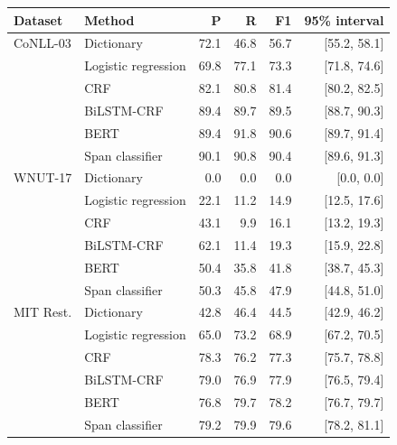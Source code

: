 \begingroup\small\setlength{\tabcolsep}{3pt}
\begin{tabular*}{\linewidth}{@{\extracolsep{\fill}}llrrrr@{}}
\toprule
Dataset & Method & P & R & F1 & 95\% interval \\
\midrule
CoNLL-03 & Dictionary & 72.1 & 46.8 & 56.7 & [55.2, 58.1] \\
 & Logistic regression & 69.8 & 77.1 & 73.3 & [71.8, 74.6] \\
 & CRF & 82.1 & 80.8 & 81.4 & [80.2, 82.5] \\
 & BiLSTM-CRF & 89.4 & 89.7 & 89.5 & [88.7, 90.3] \\
 & BERT & 89.4 & 91.8 & 90.6 & [89.7, 91.4] \\
 & Span classifier & 90.1 & 90.8 & 90.4 & [89.6, 91.3] \\
WNUT-17 & Dictionary & 0.0 & 0.0 & 0.0 & [0.0, 0.0] \\
 & Logistic regression & 22.1 & 11.2 & 14.9 & [12.5, 17.6] \\
 & CRF & 43.1 & 9.9 & 16.1 & [13.2, 19.3] \\
 & BiLSTM-CRF & 62.1 & 11.4 & 19.3 & [15.9, 22.8] \\
 & BERT & 50.4 & 35.8 & 41.8 & [38.7, 45.3] \\
 & Span classifier & 50.3 & 45.8 & 47.9 & [44.8, 51.0] \\
MIT Rest. & Dictionary & 42.8 & 46.4 & 44.5 & [42.9, 46.2] \\
 & Logistic regression & 65.0 & 73.2 & 68.9 & [67.2, 70.5] \\
 & CRF & 78.3 & 76.2 & 77.3 & [75.7, 78.8] \\
 & BiLSTM-CRF & 79.0 & 76.9 & 77.9 & [76.5, 79.4] \\
 & BERT & 76.8 & 79.7 & 78.2 & [76.7, 79.7] \\
 & Span classifier & 79.2 & 79.9 & 79.6 & [78.2, 81.1] \\
\bottomrule
\end{tabular*}
\endgroup
